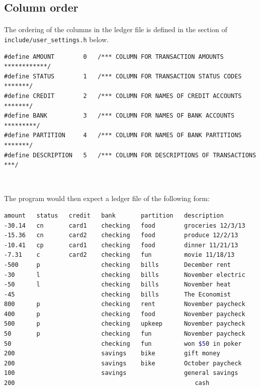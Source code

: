 \documentclass{article}
\providecommand{\q}{$\quad$ \newline}
\begin{document}
\begin{flushleft}
\section{Column order}


\paragraph{} The ordering of the columns in the ledger file is defined in the section of {\tt include/user\_settings.h} below.

\begin{lstlisting}
#define AMOUNT        0   /*** COLUMN FOR TRANSACTION AMOUNTS ************/
#define STATUS        1   /*** COLUMN FOR TRANSACTION STATUS CODES *******/
#define CREDIT        2   /*** COLUMN FOR NAMES OF CREDIT ACCOUNTS *******/
#define BANK          3   /*** COLUMN FOR NAMES OF BANK ACCOUNTS *********/       
#define PARTITION     4   /*** COLUMN FOR NAMES OF BANK PARTITIONS *******/
#define DESCRIPTION   5   /*** COLUMN FOR DESCRIPTIONS OF TRANSACTIONS ***/
\end{lstlisting} \q

The program would then expect a ledger file of the following form: \q

\begin{lstlisting}[language=bash]
amount   status   credit   bank       partition   description
-30.14   cn       card1    checking   food        groceries 12/3/13
-15.36   cn       card2    checking   food        produce 12/2/13
-10.41   cp       card1    checking   food        dinner 11/21/13
-7.31    c        card2    checking   fun         movie 11/18/13
-500     p                 checking   bills       December rent
-30      l                 checking   bills       November electric
-50      l                 checking   bills       November heat
-45                        checking   bills       The Economist
800      p                 checking   rent        November paycheck		
400      p                 checking   food        November paycheck	
500      p                 checking   upkeep      November paycheck		
50       p                 checking   fun         November paycheck	
50                         checking   fun         won $50 in poker		
200                        savings    bike        gift money
200                        savings    bike        October paycheck
100                        savings                general savings
200                                                  cash
\end{lstlisting} \q


\end{flushleft}
\end{document}
